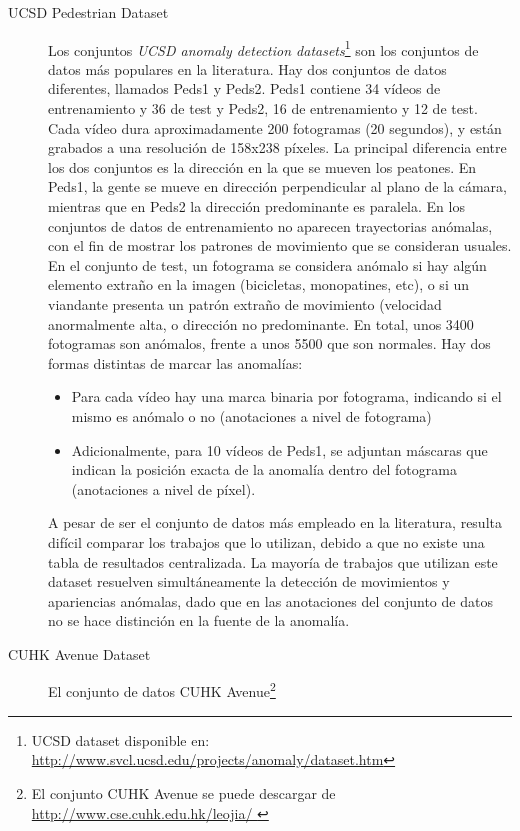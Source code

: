 \documentclass[../main.tex]{memoir}
\begin{document}
\begin{description}
\item[UCSD Pedestrian Dataset] Los conjuntos \textit{UCSD anomaly
    detection datasets}\footnote{UCSD dataset disponible en:
    \url{http://www.svcl.ucsd.edu/projects/anomaly/dataset.htm}}
  \cite{mahadevan2010anomaly} son los conjuntos de datos más populares
  en la literatura. Hay dos conjuntos de datos diferentes, llamados
  Peds1 y Peds2. Peds1 contiene 34 vídeos de entrenamiento y 36 de
  test y Peds2, 16 de entrenamiento y 12 de test. Cada vídeo dura
  aproximadamente 200 fotogramas (20 segundos), y están grabados a una
  resolución de 158x238 píxeles. La principal diferencia entre los dos
  conjuntos es la dirección en la que se mueven los peatones. En
  Peds1, la gente se mueve en dirección perpendicular al plano de la
  cámara, mientras que en Peds2 la dirección predominante es paralela.
  En los conjuntos de datos de entrenamiento no aparecen trayectorias
  anómalas, con el fin de mostrar los patrones de movimiento que se
  consideran usuales. En el conjunto de test, un fotograma se
  considera anómalo si hay algún elemento extraño en la imagen
  (bicicletas, monopatines, etc), o si un viandante presenta un patrón
  extraño de movimiento (velocidad anormalmente alta, o dirección no
  predominante. En total, unos 3400 fotogramas son anómalos, frente a
  unos 5500 que son normales.  Hay dos formas distintas de marcar las
  anomalías:
  \begin{itemize}
  \item Para cada vídeo hay una marca binaria por fotograma, indicando
    si el mismo es anómalo o no (anotaciones a nivel de fotograma)
  \item Adicionalmente, para 10 vídeos de Peds1, se adjuntan máscaras
    que indican la posición exacta de la anomalía dentro del fotograma
    (anotaciones a nivel de píxel).
  \end{itemize}
  A pesar de ser el conjunto de datos más empleado en la literatura,
  resulta difícil comparar los trabajos que lo utilizan, debido a que
  no existe una tabla de resultados centralizada. La mayoría de
  trabajos que utilizan este dataset resuelven simultáneamente la
  detección de movimientos y apariencias anómalas, dado que en las
  anotaciones del conjunto de datos no se hace distinción en la fuente
  de la anomalía.
\item[CUHK Avenue Dataset] El conjunto de datos CUHK
  Avenue\footnote{El conjunto CUHK Avenue se puede descargar de
    \url{http://www.cse.cuhk.edu.hk/leojia/
}}
\end{description}
\end{document}
